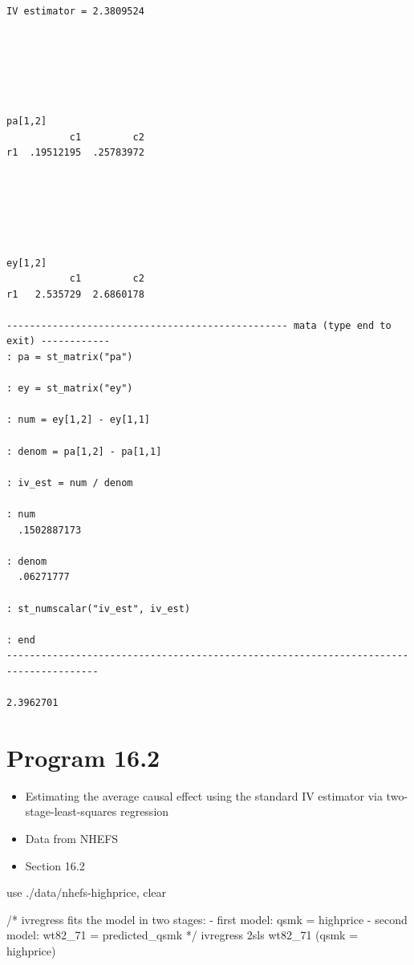 \documentclass[
  10pt,
  a4paper,
]{book}
\newenvironment{Shaded}{\begin{snugshade}}{\end{snugshade}}
\newcommand{\CommentTok}[1]{\textcolor[rgb]{0.37,0.37,0.37}{#1}}
\newcommand{\KeywordTok}[1]{\textcolor[rgb]{0.00,0.46,0.62}{#1}}
\newcommand{\NormalTok}[1]{\textcolor[rgb]{0.00,0.46,0.62}{#1}}
\providecommand{\tightlist}{%
  \setlength{\itemsep}{0pt}\setlength{\parskip}{0pt}}
\begin{document}
\begin{verbatim}
IV estimator = 2.3809524






pa[1,2]
           c1         c2
r1  .19512195  .25783972






ey[1,2]
           c1         c2
r1   2.535729  2.6860178

------------------------------------------------- mata (type end to exit) ------------
: pa = st_matrix("pa")

: ey = st_matrix("ey")

: num = ey[1,2] - ey[1,1] 

: denom = pa[1,2] - pa[1,1]

: iv_est = num / denom 

: num
  .1502887173

: denom
  .06271777

: st_numscalar("iv_est", iv_est)

: end
--------------------------------------------------------------------------------------

2.3962701
\end{verbatim}

\hypertarget{program-16.2-1}{%
\section{Program 16.2}\label{program-16.2-1}}

\begin{itemize}
\tightlist
\item
  Estimating the average causal effect using the standard IV estimator via two-stage-least-squares regression
\item
  Data from NHEFS
\item
  Section 16.2
\end{itemize}

\begin{Shaded}
\begin{Highlighting}[]
\KeywordTok{use}\NormalTok{ ./}\KeywordTok{data}\NormalTok{/nhefs{-}highprice, }\KeywordTok{clear}

\CommentTok{/* ivregress fits the model in two stages:}
\CommentTok{{-} first model: qsmk = highprice}
\CommentTok{{-} second model: wt82\_71 = predicted\_qsmk */}
\NormalTok{ivregress 2sls wt82\_71 (qsmk = highprice)}
\end{Highlighting}
\end{Shaded}
\end{document}
